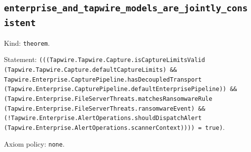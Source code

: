 \documentclass[11pt]{article}
\begin{document}
\subsection*{\texttt{enterprise\_and\_tapwire\_models\_are\_jointly\_consistent}}
\noindent Kind: \texttt{theorem}.\par
\noindent Statement: \texttt{(((Tapwire.Tapwire.Capture.isCaptureLimitsValid (Tapwire.Tapwire.Capture.defaultCaptureLimits) \&\& Tapwire.Enterprise.CapturePipeline.hasDecoupledTransport (Tapwire.Enterprise.CapturePipeline.defaultEnterprisePipeline)) \&\& (Tapwire.Enterprise.FileServerThreats.matchesRansomwareRule (Tapwire.Enterprise.FileServerThreats.ransomwareEvent) \&\& (!Tapwire.Enterprise.AlertOperations.shouldDispatchAlert (Tapwire.Enterprise.AlertOperations.scannerContext)))) = true)}.\par
\noindent Axiom policy: \texttt{none}.\par
\end{document}
